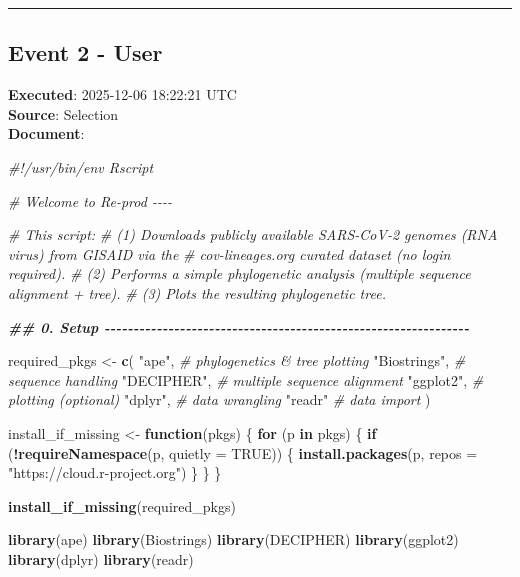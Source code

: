\documentclass[
  11pt,
]{article}
\newenvironment{Shaded}{\begin{snugshade}}{\end{snugshade}}
\newcommand{\AttributeTok}[1]{\textcolor[rgb]{0.13,0.29,0.53}{#1}}
\newcommand{\CommentTok}[1]{\textcolor[rgb]{0.56,0.35,0.01}{\textit{#1}}}
\newcommand{\ConstantTok}[1]{\textcolor[rgb]{0.56,0.35,0.01}{#1}}
\newcommand{\ControlFlowTok}[1]{\textcolor[rgb]{0.13,0.29,0.53}{\textbf{#1}}}
\newcommand{\DocumentationTok}[1]{\textcolor[rgb]{0.56,0.35,0.01}{\textbf{\textit{#1}}}}
\newcommand{\FunctionTok}[1]{\textcolor[rgb]{0.13,0.29,0.53}{\textbf{#1}}}
\newcommand{\NormalTok}[1]{#1}
\newcommand{\OtherTok}[1]{\textcolor[rgb]{0.56,0.35,0.01}{#1}}
\newcommand{\SpecialCharTok}[1]{\textcolor[rgb]{0.81,0.36,0.00}{\textbf{#1}}}
\newcommand{\StringTok}[1]{\textcolor[rgb]{0.31,0.60,0.02}{#1}}
\begin{document}
\begin{center}\rule{0.5\linewidth}{0.5pt}\end{center}

\subsection{Event 2 - User}\label{event-2---user}

\textbf{Executed}: 2025-12-06 18:22:21 UTC\\
\textbf{Source}: Selection\\
\textbf{Document}:

\begin{Shaded}
\begin{Highlighting}[]
\CommentTok{\#!/usr/bin/env Rscript}

\CommentTok{\# Welcome to Re{-}prod {-}{-}{-}{-}}

\CommentTok{\# This script:}
\CommentTok{\# (1) Downloads publicly available SARS{-}CoV{-}2 genomes (RNA virus) from GISAID via the}
\CommentTok{\#     cov{-}lineages.org curated dataset (no login required).}
\CommentTok{\# (2) Performs a simple phylogenetic analysis (multiple sequence alignment + tree).}
\CommentTok{\# (3) Plots the resulting phylogenetic tree.}

\DocumentationTok{\#\# 0. Setup {-}{-}{-}{-}{-}{-}{-}{-}{-}{-}{-}{-}{-}{-}{-}{-}{-}{-}{-}{-}{-}{-}{-}{-}{-}{-}{-}{-}{-}{-}{-}{-}{-}{-}{-}{-}{-}{-}{-}{-}{-}{-}{-}{-}{-}{-}{-}{-}{-}{-}{-}{-}{-}{-}{-}{-}{-}{-}{-}{-}{-}{-}{-}}

\NormalTok{required\_pkgs }\OtherTok{\textless{}{-}} \FunctionTok{c}\NormalTok{(}
  \StringTok{"ape"}\NormalTok{,          }\CommentTok{\# phylogenetics \& tree plotting}
  \StringTok{"Biostrings"}\NormalTok{,   }\CommentTok{\# sequence handling}
  \StringTok{"DECIPHER"}\NormalTok{,     }\CommentTok{\# multiple sequence alignment}
  \StringTok{"ggplot2"}\NormalTok{,      }\CommentTok{\# plotting (optional)}
  \StringTok{"dplyr"}\NormalTok{,        }\CommentTok{\# data wrangling}
  \StringTok{"readr"}         \CommentTok{\# data import}
\NormalTok{)}

\NormalTok{install\_if\_missing }\OtherTok{\textless{}{-}} \ControlFlowTok{function}\NormalTok{(pkgs) \{}
  \ControlFlowTok{for}\NormalTok{ (p }\ControlFlowTok{in}\NormalTok{ pkgs) \{}
    \ControlFlowTok{if}\NormalTok{ (}\SpecialCharTok{!}\FunctionTok{requireNamespace}\NormalTok{(p, }\AttributeTok{quietly =} \ConstantTok{TRUE}\NormalTok{)) \{}
      \FunctionTok{install.packages}\NormalTok{(p, }\AttributeTok{repos =} \StringTok{"https://cloud.r{-}project.org"}\NormalTok{)}
\NormalTok{    \}}
\NormalTok{  \}}
\NormalTok{\}}

\FunctionTok{install\_if\_missing}\NormalTok{(required\_pkgs)}

\FunctionTok{library}\NormalTok{(ape)}
\FunctionTok{library}\NormalTok{(Biostrings)}
\FunctionTok{library}\NormalTok{(DECIPHER)}
\FunctionTok{library}\NormalTok{(ggplot2)}
\FunctionTok{library}\NormalTok{(dplyr)}
\FunctionTok{library}\NormalTok{(readr)}
\end{Highlighting}
\end{Shaded}
\end{document}
